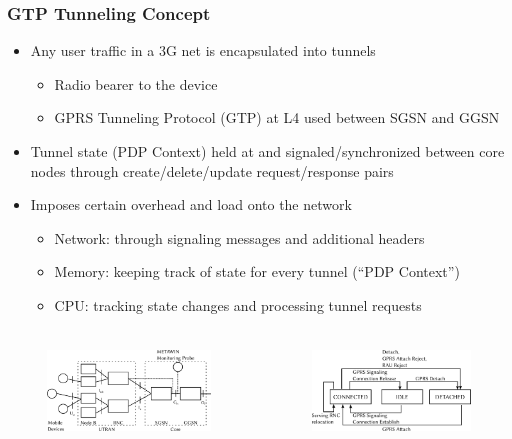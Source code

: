 \documentclass{beamer}
\begin{document}
\begin{frame}
    \frametitle{GTP Tunneling Concept}

    \begin{itemize}
		\item Any user traffic in a 3G net is encapsulated into tunnels
		\begin{itemize}
			\item Radio bearer to the device
			\item GPRS Tunneling Protocol (GTP) at L4 used between SGSN and GGSN
		\end{itemize}
		\item Tunnel state (PDP Context) held at and signaled/synchronized between core nodes through create/delete/update request/response pairs
		\item Imposes certain overhead and load onto the network
		\begin{itemize}
			\item Network: through signaling messages and additional headers
			\item Memory: keeping track of state for every tunnel (``PDP Context'')
			\item CPU: tracking state changes and processing tunnel requests
		\end{itemize}
	\end{itemize}

	\begin{columns}
			\vspace{-0.6cm}
			\begin{figure}	
				\includegraphics[height=2.5cm]{../../chapters/04-mobilenets/images/umts-network.pdf}
			\end{figure}

			\vspace{-0.6cm}
			\begin{figure}
				\includegraphics[height=2.5cm]{../../chapters/04-mobilenets/images/mm-3g-state-model.pdf}
			\end{figure}
	\end{columns}
\end{frame}
\end{document}
